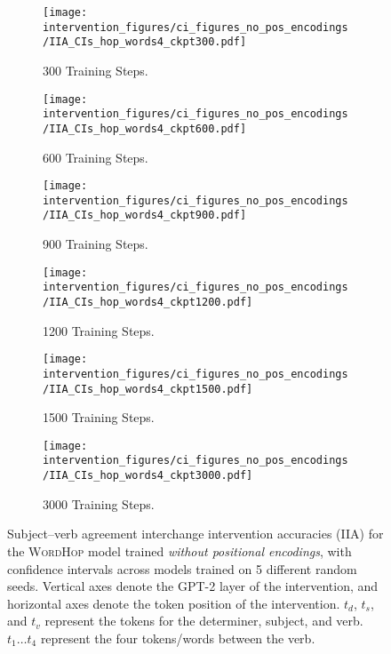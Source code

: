 \documentclass[11pt]{article}
\begin{document}
\begin{figure*}
    \centering
     \begin{subfigure}{0.49\textwidth}
         \centering
         \texttt{[image: intervention\_figures/ci\_figures\_no\_pos\_encodings/IIA\_CIs\_hop\_words4\_ckpt300.pdf]}
         \caption{300 Training Steps.}
     \end{subfigure}
     \begin{subfigure}{0.49\textwidth}
         \centering
         \texttt{[image: intervention\_figures/ci\_figures\_no\_pos\_encodings/IIA\_CIs\_hop\_words4\_ckpt600.pdf]}
         \caption{600 Training Steps.}
     \end{subfigure}
     \begin{subfigure}{0.49\textwidth}
         \centering
         \texttt{[image: intervention\_figures/ci\_figures\_no\_pos\_encodings/IIA\_CIs\_hop\_words4\_ckpt900.pdf]}
         \caption{900 Training Steps.}
     \end{subfigure}
     \begin{subfigure}{0.49\textwidth}
         \centering
         \texttt{[image: intervention\_figures/ci\_figures\_no\_pos\_encodings/IIA\_CIs\_hop\_words4\_ckpt1200.pdf]}
         \caption{1200 Training Steps.}
     \end{subfigure}
     \begin{subfigure}{0.49\textwidth}
         \centering
         \texttt{[image: intervention\_figures/ci\_figures\_no\_pos\_encodings/IIA\_CIs\_hop\_words4\_ckpt1500.pdf]}
         \caption{1500 Training Steps.}
     \end{subfigure}
     \begin{subfigure}{0.49\textwidth}
         \centering
         \texttt{[image: intervention\_figures/ci\_figures\_no\_pos\_encodings/IIA\_CIs\_hop\_words4\_ckpt3000.pdf]}
         \caption{3000 Training Steps.}
     \end{subfigure}
    \caption{Subject--verb agreement interchange intervention accuracies (IIA) for the \textsc{WordHop} model trained \emph{without positional encodings}, with confidence intervals across models trained on 5 different random seeds. Vertical axes denote the GPT-2 layer of the intervention, and horizontal axes denote the token position of the intervention. $t_d$, $t_s$, and $t_v$ represent the tokens for the determiner, subject, and verb. $t_1 \dots t_4$ represent the four tokens/words between the verb.}
    \label{fig:iia_ci_hop_words4_no_pos_encodings}
\end{figure*}
\end{document}
